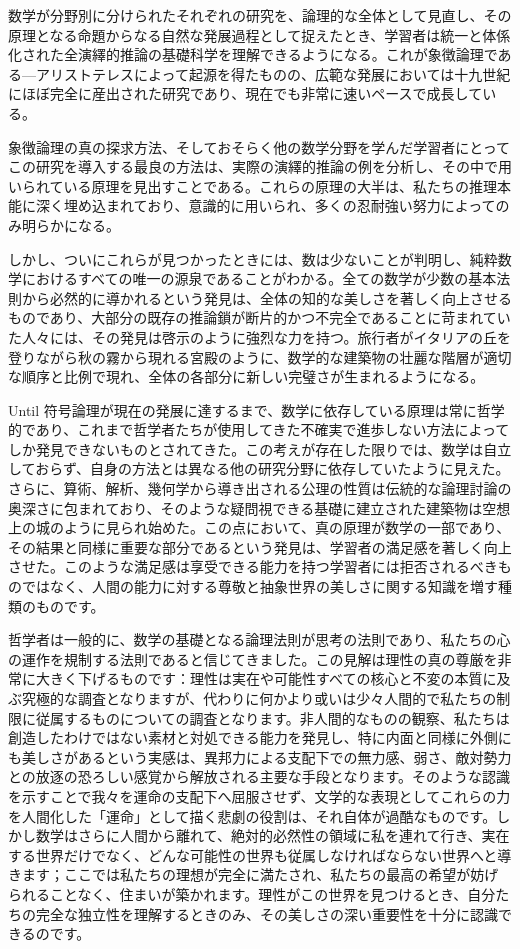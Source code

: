 \documentclass[a4paper,11pt,openany]{ltjsbook}
\begin{document}
数学が分野別に分けられたそれぞれの研究を、論理的な全体として見直し、その原理となる命題からなる自然な発展過程として捉えたとき、学習者は統一と体係化された全演繹的推論の基礎科学を理解できるようになる。これが象徴論理である—アリストテレスによって起源を得たものの、広範な発展においては十九世紀にほぼ完全に産出された研究であり、現在でも非常に速いペースで成長している。

象徴論理の真の探求方法、そしておそらく他の数学分野を学んだ学習者にとってこの研究を導入する最良の方法は、実際の演繹的推論の例を分析し、その中で用いられている原理を見出すことである。これらの原理の大半は、私たちの推理本能に深く埋め込まれており、意識的に用いられ、多くの忍耐強い努力によってのみ明らかになる。

しかし、ついにこれらが見つかったときには、数は少ないことが判明し、純粋数学におけるすべての唯一の源泉であることがわかる。全ての数学が少数の基本法則から必然的に導かれるという発見は、全体の知的な美しさを著しく向上させるものであり、大部分の既存の推論鎖が断片的かつ不完全であることに苛まれていた人々には、その発見は啓示のように強烈な力を持つ。旅行者がイタリアの丘を登りながら秋の霧から現れる宮殿のように、数学的な建築物の壮麗な階層が適切な順序と比例で現れ、全体の各部分に新しい完璧さが生まれるようになる。

Until 符号論理が現在の発展に達するまで、数学に依存している原理は常に哲学的であり、これまで哲学者たちが使用してきた不確実で進歩しない方法によってしか発見できないものとされてきた。この考えが存在した限りでは、数学は自立しておらず、自身の方法とは異なる他の研究分野に依存していたように見えた。さらに、算術、解析、幾何学から導き出される公理の性質は伝統的な論理討論の奥深さに包まれており、そのような疑問視できる基礎に建立された建築物は空想上の城のように見られ始めた。この点において、真の原理が数学の一部であり、その結果と同様に重要な部分であるという発見は、学習者の満足感を著しく向上させた。このような満足感は享受できる能力を持つ学習者には拒否されるべきものではなく、人間の能力に対する尊敬と抽象世界の美しさに関する知識を増す種類のものです。

哲学者は一般的に、数学の基礎となる論理法則が思考の法則であり、私たちの心の運作を規制する法則であると信じてきました。この見解は理性の真の尊厳を非常に大きく下げるものです：理性は実在や可能性すべての核心と不変の本質に及ぶ究極的な調査となりますが、代わりに何かより或いは少々人間的で私たちの制限に従属するものについての調査となります。非人間的なものの観察、私たちは創造したわけではない素材と対処できる能力を発見し、特に内面と同様に外側にも美しさがあるという実感は、異邦力による支配下での無力感、弱さ、敵対勢力との放逐の恐ろしい感覚から解放される主要な手段となります。そのような認識を示すことで我々を運命の支配下へ屈服させず、文学的な表現としてこれらの力を人間化した「運命」として描く悲劇の役割は、それ自体が過酷なものです。しかし数学はさらに人間から離れて、絶対的必然性の領域に私を連れて行き、実在する世界だけでなく、どんな可能性の世界も従属しなければならない世界へと導きます；ここでは私たちの理想が完全に満たされ、私たちの最高の希望が妨げられることなく、住まいが築かれます。理性がこの世界を見つけるとき、自分たちの完全な独立性を理解するときのみ、その美しさの深い重要性を十分に認識できるのです。
\end{document}
